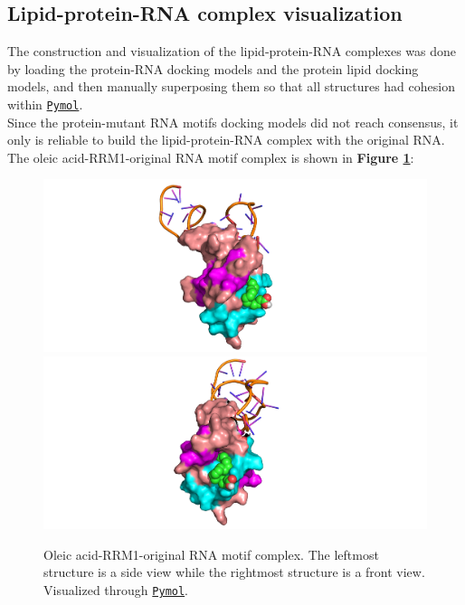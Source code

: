 \subsection{Lipid-protein-RNA complex visualization}

The construction and visualization of the lipid-protein-RNA complexes was done by loading the protein-RNA docking models and the protein lipid docking models, and then manually superposing them so that all structures had cohesion within \href{https://pymol.org/2/}{\texttt{Pymol}}.\\

Since the protein-mutant RNA motifs docking models did not reach consensus, it only is reliable to build the lipid-protein-RNA complex with the original RNA. The oleic acid-RRM1-original RNA motif complex is shown in \textbf{Figure \ref{fig:oleicOrigComplex}}:

\begin{figure}[htbp!]
        \includegraphics[trim={6.5cm 0 5.5cm 0},clip,width=\linewidth]{assets/RRM1_orig_oleic1.png}
    \endminipage\hfill
        \includegraphics[trim={6.5cm 0 7cm 0},clip,width=\linewidth]{assets/RRM1_orig_oleic2.png}
    \endminipage
    \caption[Oleic acid-RRM1-original RNA motif complex.]{Oleic acid-RRM1-original RNA motif complex. The leftmost structure is a side view while the rightmost structure is a front view. Visualized through \href{https://pymol.org/2/}{\texttt{Pymol}}.}
    \label{fig:oleicOrigComplex}
\end{figure}

